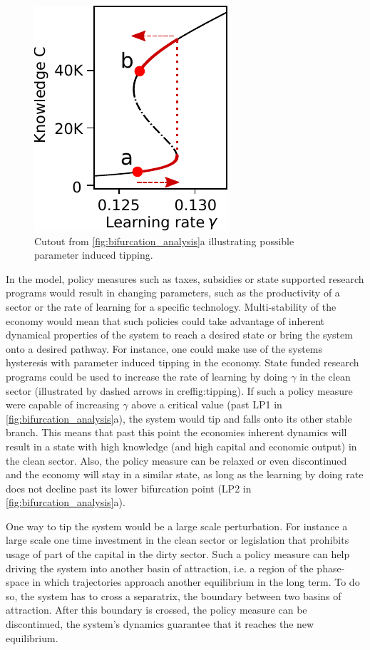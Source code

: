 \begin{figure}
  \includegraphics[width=.3 \textwidth]{figures/fig_ba_wide.pdf}
  \caption{Cutout from \cref{fig:bifurcation_analysis}a illustrating possible parameter induced tipping.}
  \label{fig:tipping}
\end{figure}

In the model, policy measures such as taxes, subsidies or state supported research programs would result in changing parameters, such as the productivity of a sector or the rate of learning for a specific technology. 
Multi-stability of the economy would mean that such policies could take advantage of inherent dynamical properties of the system to reach a desired state or bring the system onto a desired pathway.
For instance, one could make use of the systems hysteresis with parameter induced tipping in the economy. State funded research programs could be used to increase the rate of learning by doing $\gamma$ in the clean sector (illustrated by dashed arrows in cref{fig:tipping}). If such a policy measure were capable of increasing $\gamma$ above a critical value (past LP1 in \cref{fig:bifurcation_analysis}a), the system would tip and falls onto its other stable branch. This means that past this point the economies inherent dynamics will result in a state with high knowledge (and high capital and economic output) in the clean sector. Also, the policy measure can be relaxed or even discontinued and the economy will stay in a similar state, as long as the learning by doing rate does not decline past its lower bifurcation point (LP2 in \cref{fig:bifurcation_analysis}a).

One way to tip the system would be a large scale perturbation. For instance a large scale one time investment in the clean sector or legislation that prohibits usage of part of the capital in the dirty sector.
Such a policy measure can help driving the system into another basin of attraction, i.e. a region of the phase-space in which trajectories approach another equilibrium in the long term. 
To do so, the system has to cross a separatrix, the boundary between two basins of attraction. 
After this boundary is crossed, the policy measure can be discontinued, the system's dynamics guarantee that it reaches the new equilibrium.

